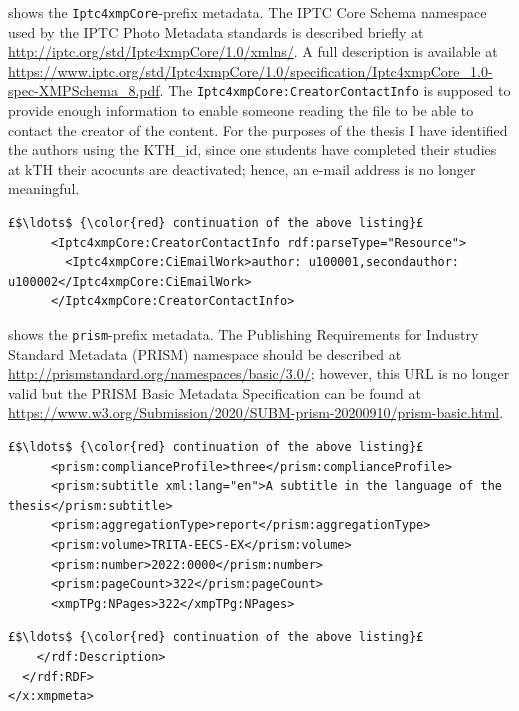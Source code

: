  shows the \texttt{Iptc4xmpCore}-prefix metadata. The IPTC Core Schema namespace used by the IPTC Photo Metadata standards is described briefly at \url{http://iptc.org/std/Iptc4xmpCore/1.0/xmlns/}. A full description is available at \url{https://www.iptc.org/std/Iptc4xmpCore/1.0/specification/Iptc4xmpCore_1.0-spec-XMPSchema_8.pdf}. The \texttt{Iptc4xmpCore:CreatorContactInfo} is supposed to provide enough information to enable someone reading the file to be able to contact the creator of the content. For the purposes of the thesis I have identified the authors using the KTH\_id, since one students have completed their studies at kTH their acocunts are deactivated; hence, an e-mail address is no longer meaningful.
\begin{lstlisting}[style=myXML,
caption={The \texttt{Iptc4xmpCore}-prefix metadata embedded in a PDF file}, label={lst:pdfinfoOutputPart14}]
£$\ldots$ {\color{red} continuation of the above listing}£ 
      <Iptc4xmpCore:CreatorContactInfo rdf:parseType="Resource">
        <Iptc4xmpCore:CiEmailWork>author: u100001,secondauthor: u100002</Iptc4xmpCore:CiEmailWork>
      </Iptc4xmpCore:CreatorContactInfo>
\end{lstlisting}

 shows the \texttt{prism}-prefix metadata. The Publishing Requirements for Industry Standard Metadata (PRISM) namespace should be described at \url{http://prismstandard.org/namespaces/basic/3.0/}; however, this URL is no longer valid but the PRISM Basic Metadata Specification can be found at \url{https://www.w3.org/Submission/2020/SUBM-prism-20200910/prism-basic.html}.
\begin{lstlisting}[style=myXML,
caption={The \texttt{prism}-prefix metadata embedded in a PDF file}, label={lst:pdfinfoOutputPart15}]
£$\ldots$ {\color{red} continuation of the above listing}£ 
      <prism:complianceProfile>three</prism:complianceProfile>
      <prism:subtitle xml:lang="en">A subtitle in the language of the thesis</prism:subtitle>
      <prism:aggregationType>report</prism:aggregationType>
      <prism:volume>TRITA-EECS-EX</prism:volume>
      <prism:number>2022:0000</prism:number>
      <prism:pageCount>322</prism:pageCount>
      <xmpTPg:NPages>322</xmpTPg:NPages>
\end{lstlisting}

\begin{lstlisting}[style=myXML,
caption={The final part of the metadata embedded in a PDF file}, label={lst:pdfinfoOutputPart16}]
£$\ldots$ {\color{red} continuation of the above listing}£ 
    </rdf:Description>
  </rdf:RDF>
</x:xmpmeta>
\end{lstlisting}

